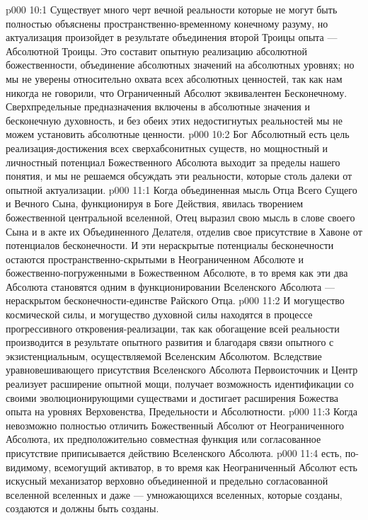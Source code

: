 \vs p000 10:1 Существует много черт вечной реальности  которые не могут быть полностью объяснены пространственно\hyp{}временному конечному разуму, но актуализация  произойдет в результате объединения второй Троицы опыта --- Абсолютной Троицы. Это составит опытную реализацию абсолютной божественности, объединение абсолютных значений на абсолютных уровнях; но мы не уверены относительно охвата всех абсолютных ценностей, так как нам никогда не говорили, что Ограниченный Абсолют эквивалентен Бесконечному. Сверхпредельные предназначения включены в абсолютные значения и бесконечную духовность, и без обеих этих недостигнутых реальностей мы не можем установить абсолютные ценности.
\vs p000 10:2 Бог Абсолютный есть цель реализация\hyp{}достижения всех сверхабсонитных существ, но мощностный и личностный потенциал Божественного Абсолюта выходит за пределы нашего понятия, и мы не решаемся обсуждать эти реальности, которые столь далеки от опытной актуализации.
\vs p000 11:1 Когда объединенная мысль Отца Всего Сущего и Вечного Сына, функционируя в Боге Действия, явилась творением божественной центральной вселенной, Отец выразил свою мысль в слове своего Сына и в акте их Объединенного Делателя, отделив свое присутствие в Хавоне от потенциалов бесконечности. И эти нераскрытые потенциалы бесконечности остаются пространственно\hyp{}скрытыми в Неограниченном Абсолюте и божественно\hyp{}погруженными в Божественном Абсолюте, в то время как эти два Абсолюта становятся одним в функционировании Вселенского Абсолюта --- нераскрытом бесконечности\hyp{}единстве Райского Отца.
\vs p000 11:2 И могущество космической силы, и могущество духовной силы находятся в процессе прогрессивного откровения\hyp{}реализации, так как обогащение всей реальности производится в результате опытного развития и благодаря связи опытного с экзистенциальным, осуществляемой Вселенским Абсолютом. Вследствие уравновешивающего присутствия Вселенского Абсолюта Первоисточник и Центр реализует расширение опытной мощи, получает возможность идентификации со своими эволюционирующими существами и достигает расширения Божества опыта на уровнях Верховенства, Предельности и Абсолютности.
\vs p000 11:3 \pc Когда невозможно полностью отличить Божественный Абсолют от Неограниченного Абсолюта, их предположительно совместная функция или согласованное присутствие приписывается действию Вселенского Абсолюта.
\vs p000 11:4 \pc {}\bibnobreakspace {} есть, по\hyp{}видимому, всемогущий активатор, в то время как Неограниченный Абсолют есть искусный механизатор верховно объединенной и предельно согласованной вселенной вселенных и даже --- умножающихся вселенных, которые созданы, создаются и должны быть созданы.
